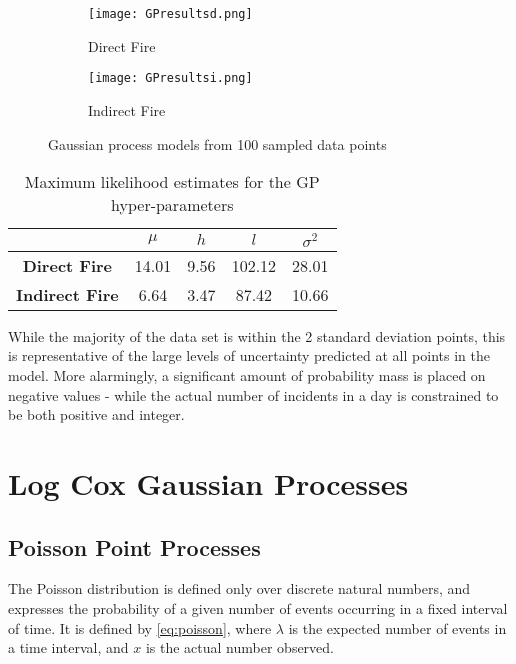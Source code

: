 \documentclass[a4paper,11pt]{report}
\begin{document}
\begin{figure}
\centering
\begin{subfigure}{.5\textwidth}
	\centering
	\texttt{[image: GPresultsd.png]}
  	\caption{Direct Fire}
  	\label{fig:sub1}
\end{subfigure}%
\begin{subfigure}{.5\textwidth}
  	\centering
  	\texttt{[image: GPresultsi.png]}
  	\caption{Indirect Fire}
 	 \label{fig:sub2}
\end{subfigure}
\caption{Gaussian process models from 100 sampled data points}
\label{fig:GPresults}
\end{figure}

\singlespacing
\begin{table}[]
\centering
\caption{Maximum likelihood estimates for the GP hyper-parameters}
\label{GPhyperparameters}
\begin{tabular}{c|c|c|c|c|}
\cline{2-5}
\textbf{}                                    & \(\mu\) & \(h\) & \(l\) & \(\sigma^2\) \\ \hline
\multicolumn{1}{|c|}{\textbf{Direct Fire}}   & 14.01           & 9.56          & 102.12          & 28.01              \\ \hline
\multicolumn{1}{|c|}{\textbf{Indirect Fire}} & 6.64           & 3.47          & 87.42          & 10.66              \\ \hline
\end{tabular}
\end{table}
\doublespacing

While the majority of the data set is within the 2 standard deviation points, this is representative of the large levels of uncertainty predicted at all points in the model. More alarmingly, a significant amount of probability mass is placed on negative values - while the actual number of incidents in a day is constrained to be both positive and integer. \par 


 


\chapter{Log Cox Gaussian Processes}

\section{Poisson Point Processes}
The Poisson distribution is defined only over discrete natural numbers, and expresses the probability of a given number of events occurring in a fixed interval of time. It is defined by \ref{eq:poisson}, where \(\lambda\) is the expected number of events in a time interval, and \(x\) is the actual number observed. \cite{Barber}
\end{document}
